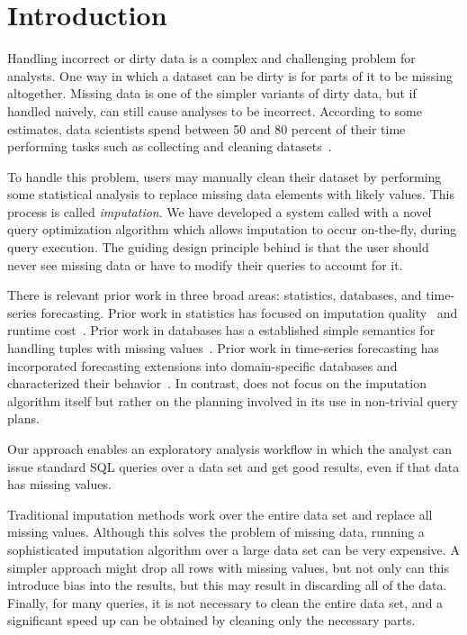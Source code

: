 \section{Introduction}

Handling incorrect or dirty data is a complex and challenging problem for analysts.
One way in which a dataset can be dirty is for parts of it to be missing altogether.
Missing data is one of the simpler variants of dirty data, but if handled naively, can still cause analyses to be incorrect.
According to some estimates, data scientists spend between 50 and 80 percent of their time performing tasks such as collecting and cleaning datasets~\cite{data-science-cleaning}.

To handle this problem, users may manually clean their dataset by performing some statistical analysis to replace missing data elements with likely values.
This process is called \emph{imputation}.
We have developed a system called \ProjectName{} with a novel query optimization algorithm which allows imputation to occur on-the-fly, during query execution.
The guiding design principle behind \ProjectName{} is that the user should never see missing data or have to modify their queries to account for it.

There is relevant prior work in three broad areas: statistics, databases, and time-series forecasting.
Prior work in statistics has focused on imputation quality~\cite{burgette2010multiple} and runtime cost~\cite{akande2015empirical}.
Prior work in databases has a established simple semantics for handling tuples with missing values~\cite{codd1973understanding,grant1977null}.
Prior work in time-series forecasting has incorporated forecasting extensions into domain-specific databases and characterized their behavior~\cite{parisi2011embedding,parisi2013temporal,duan2007processing}.
In contrast, \ProjectName{} does not focus on the imputation algorithm itself but rather on the planning involved in its use in non-trivial query plans.

Our approach enables an exploratory analysis workflow in which the analyst can issue standard SQL queries over a data set and get good results, even if that data has missing values.

Traditional imputation methods work over the entire data set and replace all missing values.
Although this solves the problem of missing data, running a sophisticated imputation algorithm over a large data set can be very expensive.
A simpler approach might drop all rows with missing values, but not only can this introduce bias into the results, but this may result in discarding all of the data.
Finally, for many queries, it is not necessary to clean the entire data set, and a significant speed up can be obtained by cleaning only the necessary parts.

